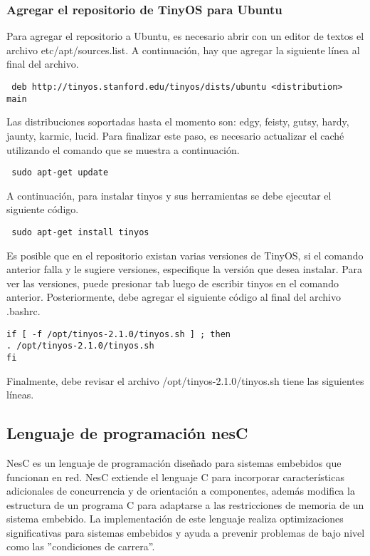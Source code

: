 \subsubsection{Agregar el repositorio de TinyOS para Ubuntu}
Para agregar el repositorio a Ubuntu, es necesario abrir con un editor de textos el archivo etc/apt/sources.list. A continuación, hay que agregar la siguiente línea al final del archivo.

\begin{verbatim}
 deb http://tinyos.stanford.edu/tinyos/dists/ubuntu <distribution> main
\end{verbatim}

Las distribuciones soportadas hasta el momento son: edgy, feisty, gutsy, hardy, jaunty, karmic, lucid. Para finalizar este paso, es necesario actualizar el caché utilizando el comando que se muestra a continuación.

\begin{verbatim}
 sudo apt-get update
\end{verbatim}

A continuación, para instalar tinyos y sus herramientas se debe ejecutar el siguiente código.

\begin{verbatim}
 sudo apt-get install tinyos
\end{verbatim}

Es posible que en el repositorio existan varias versiones de TinyOS, si el comando anterior falla y le sugiere versiones, especifique la versión que desea instalar. Para ver las versiones, puede presionar tab luego de escribir tinyos en el comando anterior. Posteriormente, debe agregar el siguiente código al final del archivo .bashrc.

\begin{verbatim}
if [ -f /opt/tinyos-2.1.0/tinyos.sh ] ; then
. /opt/tinyos-2.1.0/tinyos.sh
fi
\end{verbatim}

Finalmente, debe revisar el archivo /opt/tinyos-2.1.0/tinyos.sh tiene las siguientes líneas.



\subsection{Lenguaje de programación nesC}

NesC es un lenguaje de programación diseñado para sistemas embebidos que funcionan en red. NesC extiende el lenguaje C para incorporar características adicionales de concurrencia y de orientación a componentes, además modifica la estructura de un programa C para adaptarse a las restricciones de memoria de un sistema embebido. La implementación de este lenguaje realiza optimizaciones significativas para sistemas embebidos y ayuda a prevenir problemas de bajo nivel como las ''condiciones de carrera''.

